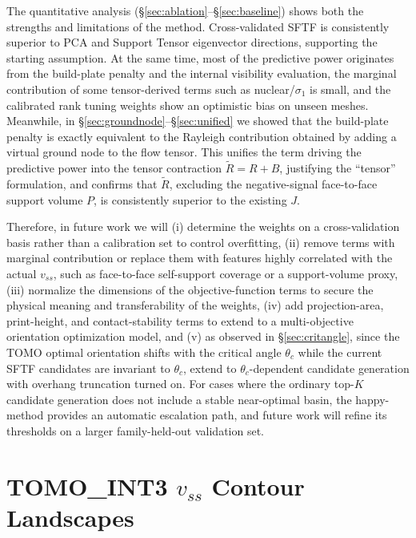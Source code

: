 \documentclass[11pt,a4paper]{article}
\begin{document}
The quantitative analysis (\S\ref{sec:ablation}--\S\ref{sec:baseline}) shows both the strengths and limitations of the method.
Cross-validated SFTF is consistently superior to PCA and Support Tensor eigenvector directions, supporting the starting assumption.
At the same time, most of the predictive power originates from the build-plate penalty and the internal visibility evaluation,
the marginal contribution of some tensor-derived terms such as nuclear/$\sigma_1$ is small, and
the calibrated rank tuning weights show an optimistic bias on unseen meshes.
Meanwhile, in \S\ref{sec:groundnode}--\S\ref{sec:unified} we showed that the build-plate penalty is exactly equivalent
to the Rayleigh contribution obtained by adding a virtual ground node to the flow tensor.
This unifies the term driving the predictive power into the tensor contraction $\tilde R=R+B$, justifying the ``tensor'' formulation,
and confirms that $\tilde R$, excluding the negative-signal face-to-face support volume $P$, is consistently superior to the existing $J$.

Therefore, in future work we will (i) determine the weights on a cross-validation basis rather than a calibration set to control overfitting,
(ii) remove terms with marginal contribution or replace them with features highly correlated with the actual $v_{ss}$,
such as face-to-face self-support coverage or a support-volume proxy,
(iii) normalize the dimensions of the objective-function terms to secure the physical meaning and transferability of the weights,
(iv) add projection-area, print-height, and contact-stability terms to extend to a multi-objective orientation optimization model, and
(v) as observed in \S\ref{sec:critangle}, since the TOMO optimal orientation shifts with the critical angle $\theta_c$ while
the current SFTF candidates are invariant to $\theta_c$, extend to $\theta_c$-dependent candidate generation with overhang truncation turned on.
For cases where the ordinary top-$K$ candidate generation does not include a stable near-optimal basin,
the happy-method provides an automatic escalation path, and future work will refine its thresholds on a larger family-held-out validation set.

\appendix

\section{TOMO\_INT3 $v_{ss}$ Contour Landscapes}
\label{sec:appendix-landscape}
\end{document}
